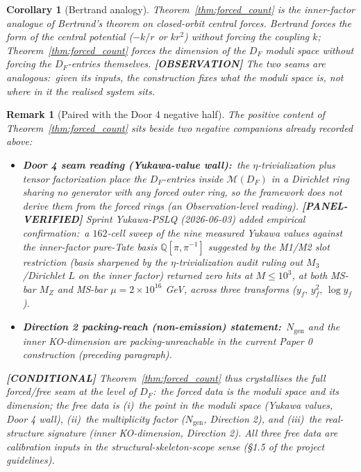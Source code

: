 \documentclass[11pt]{article}
\newtheorem{corollary}{Corollary}
\newtheorem{remark}{Remark}
\begin{document}
\begin{corollary}[Bertrand analogy]
\label{cor:bertrand_analogy}
Theorem~\ref{thm:forced_count} is the inner-factor analogue of
Bertrand's theorem on closed-orbit central forces.  Bertrand forces
the \emph{form} of the central potential ($-k/r$ or $k r^2$) without
forcing the coupling $k$; Theorem~\ref{thm:forced_count} forces the
\emph{dimension} of the $D_F$ moduli space without forcing the
$D_F$-entries themselves.  \textbf{[OBSERVATION]} The two seams are
analogous:\ given its inputs, the construction fixes what the moduli space
\emph{is}, not where in it the realised system sits.
\end{corollary}

\begin{remark}[Paired with the Door 4 negative half]
\label{rem:forced_count_with_seam}
The positive content of Theorem~\ref{thm:forced_count} sits beside two
negative companions already recorded above:
\begin{itemize}\setlength{\itemsep}{2pt}
\item \textbf{Door 4 seam reading (Yukawa-value wall):}\ the
  $\eta$-trivialization plus tensor factorization place the $D_F$-entries inside
  $\mathcal{M}(D_F)$ in a Dirichlet ring sharing no generator with any
  forced outer ring, so the framework does not derive them from the
  forced rings (an Observation-level reading).  \textbf{[PANEL-VERIFIED]}
  Sprint Yukawa-PSLQ (2026-06-03) added empirical confirmation:\ a
  $162$-cell sweep of the nine measured Yukawa values against the
  inner-factor pure-Tate basis $\mathbb{Q}[\pi, \pi^{-1}]$ suggested by
  the M1/M2 slot restriction
  (basis sharpened by the $\eta$-trivialization audit ruling out
  $M_3$/Dirichlet $L$ on the inner factor) returned zero hits at
  $M \le 10^3$, at both MS-bar $M_Z$ and MS-bar
  $\mu = 2 \times 10^{16}$ GeV, across three transforms
  ($y_f,\, y_f^2,\, \log y_f$).
\item \textbf{Direction 2 packing-reach (non-emission) statement:}\
  $N_{\mathrm{gen}}$ and the inner KO-dimension are
  packing-unreachable in the current Paper 0 construction
  (preceding paragraph).
\end{itemize}
\textbf{[CONDITIONAL]} Theorem~\ref{thm:forced_count} thus crystallises the \emph{full}
forced/free seam at the level of $D_F$:\ the forced data is the
moduli space and its dimension; the free data is (i)~the point in
the moduli space (Yukawa values, Door 4 wall), (ii)~the
multiplicity factor ($N_{\mathrm{gen}}$, Direction 2), and (iii)~the
real-structure signature (inner KO-dimension, Direction 2).  All three
free data are calibration inputs in the structural-skeleton-scope
sense (\S 1.5 of the project guidelines).
\end{remark}
\end{document}
